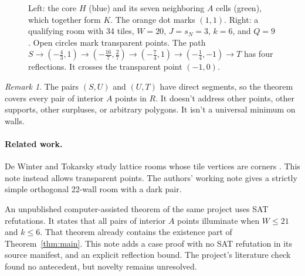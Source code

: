 \documentclass[11pt]{article}
\theoremstyle{remark}
\newtheorem{remark}{Remark}
\begin{document}
\begin{figure}[ht]
\caption{Left: the core $H$ (blue) and its seven neighboring $A$ cells (green), which together form $K$. The orange dot marks $(1,1)$. Right: a qualifying room with 34 tiles, $W=20$, $J=s_N=3$, $k=6$, and $Q=9$. Open circles mark transparent points. The path $S\to(-\tfrac43,1)\to(-\tfrac{16}7,\tfrac27)\to(-\tfrac74,1)\to(-\tfrac14,-1)\to T$ has four reflections. It crosses the transparent point $(-1,0)$.}
\label{fig:room}
\end{figure}

\begin{remark}
The pairs $(S,U)$ and $(U,T)$ have direct segments, so the theorem covers every pair of interior $A$ points in $R$. It doesn't address other points, other supports, other surpluses, or arbitrary polygons. It isn't a universal minimum on walls.
\end{remark}

\paragraph{Related work.} De Winter and Tokarsky study lattice rooms whose tile vertices are corners \cite{DeWinterTokarsky2026}. This note instead allows transparent points. The authors' working note \cite{WangWang2026} gives a strictly simple orthogonal 22-wall room with a dark pair.

An unpublished computer-assisted theorem of the same project uses SAT refutations. It states that all pairs of interior $A$ points illuminate when $W\le21$ and $k\le6$. That theorem already contains the existence part of Theorem~\ref{thm:main}. This note adds a case proof with no SAT refutation in its source manifest, and an explicit reflection bound. The project's literature check found no antecedent, but novelty remains unresolved.
\end{document}
